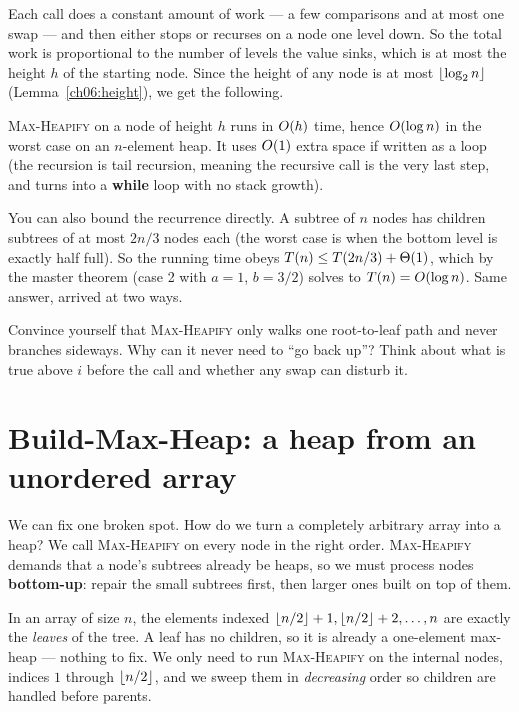 Each call does a constant amount of work --- a few comparisons and at most one
swap --- and then either stops or recurses on a node one level down. So the total
work is proportional to the number of levels the value sinks, which is at most
the height $h$ of the starting node. Since the height of any node is at most
$\lfloor\log_2 n\rfloor$ (Lemma~\ref{ch06:height}), we get the following.

\begin{complexitybox}
\textsc{Max-Heapify} on a node of height $h$ runs in $O(h)$ time, hence
$O(\log n)$ in the worst case on an $n$-element heap. It uses $O(1)$ extra
space if written as a loop (the recursion is tail recursion, meaning the recursive call is the very last step, and turns into a
\textbf{while} loop with no stack growth).
\end{complexitybox}

\begin{remark}
You can also bound the recurrence directly. A subtree of $n$ nodes has children
subtrees of at most $2n/3$ nodes each (the worst case is when the bottom level is
exactly half full). So the running time obeys $T(n) \le T(2n/3) + \Theta(1)$, which
by the master theorem (case 2 with $a=1$, $b=3/2$) solves to $T(n) = O(\log
n)$. Same answer, arrived at two ways.
\end{remark}

\begin{walkbox}
Convince yourself that \textsc{Max-Heapify} only walks one root-to-leaf
path and never branches sideways. Why can it never need to ``go back up''? Think
about what is true above $i$ before the call and whether any swap can disturb it.
\end{walkbox}

\section{Build-Max-Heap: a heap from an unordered array}

We can fix one broken spot. How do we turn a completely arbitrary array into a
heap? We call \textsc{Max-Heapify} on every node in the
right order. \textsc{Max-Heapify} demands that a node's subtrees already
be heaps, so we must process nodes \textbf{bottom-up}: repair the small
subtrees first, then larger ones built on top of them.

\begin{focusbox}
In an array of size $n$, the
elements indexed $\lfloor n/2\rfloor+1, \lfloor n/2\rfloor+2, \ldots, n$ are exactly the
\emph{leaves} of the tree. A leaf has no children, so it is already a
one-element max-heap --- nothing to fix. We only need to run
\textsc{Max-Heapify} on the internal nodes, indices $1$ through $\lfloor n/2\rfloor$,
and we sweep them in \emph{decreasing} order so children are handled before
parents.
\end{focusbox}

